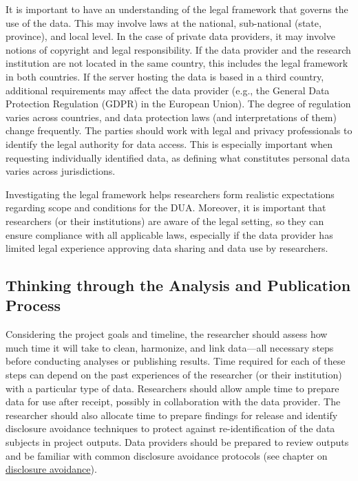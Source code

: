 It is important to have an understanding of the legal framework that governs the use of the data. This may involve laws at the national, sub-national (state, province), and local level. In the case of private data providers, it may involve notions of copyright and legal responsibility. If the data provider and the research institution are not located in the same country, this includes the legal framework in both countries. If the server hosting the data is based in a third country, additional requirements may affect the data provider (e.g., the General Data Protection Regulation (GDPR) in the European Union). The degree of regulation varies across countries, and data protection laws (and interpretations of them) change frequently. The parties should work with legal and privacy professionals to identify the legal authority for data access. This is especially important when requesting individually identified data, as defining what constitutes personal data varies across jurisdictions.

Investigating the legal framework helps researchers form realistic expectations regarding scope and conditions for the DUA. Moreover, it is important that researchers (or their institutions) are aware of the legal setting, so they can ensure compliance with all applicable laws, especially if the data provider has limited legal experience approving data sharing and data use by researchers.

\hypertarget{thinking-through-the-analysis-and-publication-process}{%
\subsection{Thinking through the Analysis and Publication Process}\label{thinking-through-the-analysis-and-publication-process}}

Considering the project goals and timeline, the researcher should assess how much time it will take to clean, harmonize, and link data---all necessary steps before conducting analyses or publishing results. Time required for each of these steps can depend on the past experiences of the researcher (or their institution) with a particular type of data. Researchers should allow ample time to prepare data for use after receipt, possibly in collaboration with the data provider. The researcher should also allocate time to prepare findings for release and identify disclosure avoidance techniques to protect against re-identification of the data subjects in project outputs. Data providers should be prepared to review outputs and be familiar with common disclosure avoidance protocols (see chapter on \protect\hyperlink{discavoid}{disclosure avoidance}).

